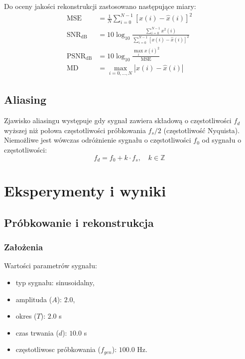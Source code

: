 \documentclass[12pt]{article}
\begin{document}
Do oceny jakości rekonstrukcji zastosowano następujące miary:
\begin{align}
    \text{MSE} &= \frac{1}{N} \sum_{i=0}^{N-1} \left[x(i) - \hat{x}(i)\right]^2 \\[4pt]
    \text{SNR}_{\text{dB}} &= 10 \log_{10} \frac{\sum_{i=0}^{N-1} x^2(i)}
                                                {\sum_{i=0}^{N-1} \left[x(i) - \hat{x}(i)\right]^2} \\[4pt]
    \text{PSNR}_{\text{dB}} &= 10 \log_{10} \frac{\max_i x(i)^2}{\text{MSE}} \\[4pt]
    \text{MD} &= \max_{i=0,\ldots,N} \left|x(i) - \hat{x}(i)\right|
\end{align}

\subsection{Aliasing}

Zjawisko aliasingu występuje gdy sygnał zawiera składową o częstotliwości $f_d$
wyższej niż połowa częstotliwości próbkowania $f_s/2$ (częstotliwość Nyquista).
Niemożliwe jest wówczas odróżnienie sygnału o częstotliwości $f_0$ od sygnału
o częstotliwości:
\begin{equation}
    f_d = f_0 + k \cdot f_s, \quad k \in \mathbb{Z}
\end{equation}

\section{Eksperymenty i wyniki}

\subsection{Próbkowanie i rekonstrukcja}
\label{subsection:probkowanie_kwantyzacja}

\subsubsection{Założenia}

Wartości parametrów sygnału:
\begin{itemize}
    \item typ sygnału: sinusoidalny,
    \item amplituda ($A$): $2.0$,
    \item okres ($T$): $2.0$ s
    \item czas trwania ($d$): $10.0$ s
    \item częstotliwosc próbkowania ($f_{gen}$): $100.0$ Hz.
\end{itemize}
\end{document}
